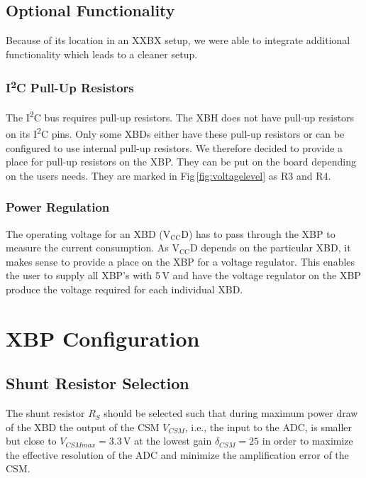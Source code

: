 \documentclass[twoside,11pt]{cergdoc}
\newcommand{\ITwoC}{I\textsuperscript{2}C }
\begin{document}
\section{Optional Functionality}
Because of its location in an XXBX setup, we were able to integrate additional 
functionality which leads to a cleaner setup.

\subsection{\ITwoC Pull-Up Resistors}
The \ITwoC bus requires pull-up resistors. The XBH does not have pull-up resistors on 
its \ITwoC pins. Only some XBDs either have these pull-up
resistors or can be configured to use internal pull-up resistors. We therefore decided
to provide a place for pull-up resistors on the XBP. They can be put on the board 
depending on the users needs. They are marked in Fig\,\ref{fig:voltagelevel} as R3 and R4.

\subsection{Power Regulation}
The operating voltage for an XBD ($\mathrm{V_{CC}D}$) has to pass through the XBP to measure the 
current consumption. As $\mathrm{V_{CC}D}$ depends on the particular XBD,
it makes sense to provide a place on the XBP for a voltage regulator. This 
enables the user to supply all XBP's with 5\,V and have the voltage regulator
on the XBP produce the voltage required for each individual XBD.

\chapter{XBP Configuration}

\section{Shunt Resistor Selection}
The shunt resistor $R_S$ should be selected such that during maximum power draw of the XBD 
the output of the CSM $V_{CSM}$, i.e., the
input to the ADC,  is smaller but close to $V_{CSMmax}=3.3\,\mathrm{V}$ at 
the lowest gain $\delta_{CSM} = 25$ in order to maximize the effective resolution
of the ADC and minimize the amplification error of the CSM. 
\end{document}
